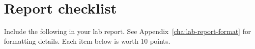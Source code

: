 %

%
%

\section{Report checklist}

Include the following in your lab report. See Appendix~\ref{cha:lab-report-format} for formatting details. Each item below is worth 10 points.

